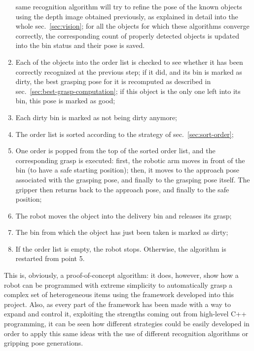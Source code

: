 \begin{enumerate}
{  same recognition algorithm will try to refine the pose of the known
  objects using the depth image obtained previously, as explained in
  detail into the whole sec.~\ref{sec:vision}; for all the objects for which
  these algorithms converge correctly, the corresponding count of
  properly detected objects is updated into the bin status and their
  pose is saved.}
\item{Each of the objects into the order list is checked to see
  whether it has been correctly recognized at the previous step; if it
did, and its bin is marked as dirty, the best grasping pose for it is
recomputed as described in sec.~\ref{sec:best-grasp-computation}; if
this object is the only one left into its bin, this pose is marked as good;}
\item{Each dirty bin is marked as not being dirty anymore;}
\item{The order list is sorted according to the strategy of
  sec.~\ref{sec:sort-order};}
\item{One order is popped from the top of the sorted order list, and
  the corresponding grasp is executed: first, the robotic arm moves in
  front of the bin (to have a safe starting position); then, it moves
  to the approach pose associated with the grasping pose, and finally
  to the  grasping pose itself. The gripper then returns back to the
  approach pose, and finally to the safe position;}
\item{The robot moves the object into the delivery bin and releases its grasp;}
\item{The bin from which the object has just been taken is marked as
  dirty;}
\item{If the order list is empty, the robot stops. Otherwise, the
  algorithm is restarted from point 5.}
\end{enumerate}

This is, obviously, a proof-of-concept algorithm: it does, however,
show how a robot can be programmed with extreme simplicity to
automatically grasp a complex set of heterogeneous items using the
framework developed into this project. Also, as every part of the
framework has been made with a way to expand and control it,
exploiting the strengths coming out from high-level C++ programming,
it can be seen how different strategies could be easily developed in
order to apply this same ideas with the use of different recognition
algorithms or gripping pose generations.
